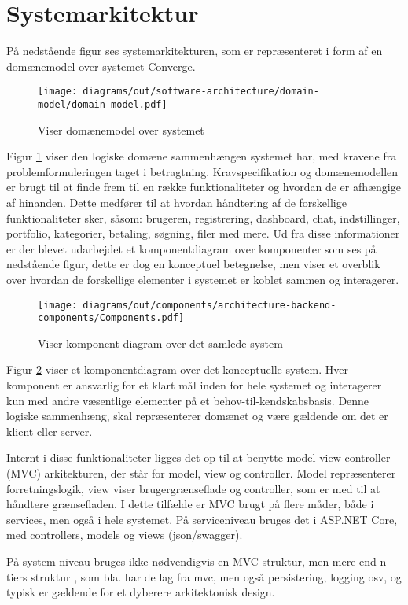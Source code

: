 
\section{Systemarkitektur}
På nedstående figur ses systemarkitekturen, som er repræsenteret i form af en domænemodel over systemet Converge.

\begin{figure}[H]
    \centering
\texttt{[image: diagrams/out/software-architecture/domain-model/domain-model.pdf]}
\caption{Viser domænemodel over systemet}
\label{fig:domainmodel}
\end{figure}

Figur \ref{fig:domainmodel} viser den logiske domæne sammenhængen systemet har, med kravene fra problemformuleringen taget i betragtning. Kravspecifikation og domænemodellen er brugt til at finde frem til en række funktionaliteter og hvordan de er afhængige af hinanden. Dette medfører til at hvordan håndtering af de forskellige funktionaliteter sker, såsom: brugeren, registrering, dashboard, chat, indstillinger, portfolio, kategorier, betaling, søgning, filer med mere. Ud fra disse informationer er der blevet udarbejdet et komponentdiagram over komponenter som ses på nedstående figur, dette er dog en konceptuel betegnelse, men viser et overblik over hvordan de forskellige elementer i systemet er koblet sammen og interagerer.

\begin{figure}[H]
    \centering
\texttt{[image: diagrams/out/components/architecture-backend-components/Components.pdf]}
\caption{Viser komponent diagram over det samlede system}
\label{fig:komponentdiagram}
\end{figure}


Figur \ref{fig:komponentdiagram} viser et komponentdiagram over det konceptuelle system. Hver komponent er ansvarlig for et klart mål inden for hele systemet og interagerer kun med andre væsentlige elementer på et behov-til-kendskabsbasis. Denne logiske sammenhæng, skal repræsenterer domænet og være gældende om det er klient eller server.

Internt i disse funktionaliteter ligges det op til at benytte model-view-controller (MVC) \cite[MVC]{converge-terms} arkitekturen, der står for model, view og controller. Model repræsenterer forretningslogik, view viser brugergrænseflade og controller, som er med til at håndtere grænsefladen. I dette tilfælde er MVC brugt på flere måder, både i services, men også i hele systemet. På serviceniveau bruges det i ASP.NET Core, med controllers, models og views (json/swagger). 

På system niveau bruges ikke nødvendigvis en MVC struktur, men mere end n-tiers struktur \cite[n-tiers struktur]{converge-terms}, som bla. har de lag fra mvc, men også persistering, logging osv, og typisk er gældende for et dyberere arkitektonisk design.



